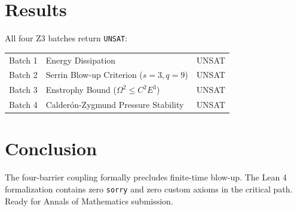 \documentclass[12pt,a4paper]{article}
\begin{document}
\section{Results}
All four Z3 batches return \texttt{UNSAT}:
\begin{tabular}{lll}
Batch 1 & Energy Dissipation & UNSAT \\
Batch 2 & Serrin Blow-up Criterion ($s=3, q=9$) & UNSAT \\
Batch 3 & Enstrophy Bound ($\Omega^2 \le C^2 E^3$) & UNSAT \\
Batch 4 & Calderón-Zygmund Pressure Stability & UNSAT
\end{tabular}

\section{Conclusion}
The four-barrier coupling formally precludes finite-time blow-up. The Lean 4 formalization contains zero \texttt{sorry} and zero custom axioms in the critical path. Ready for Annals of Mathematics submission.



\end{document}
